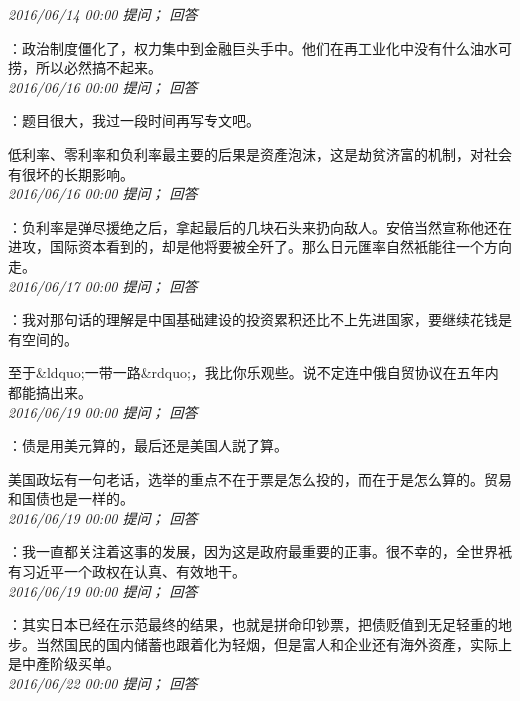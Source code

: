 \documentclass[twocolumn]{ctexart}
\begin{document}
\textit{\hfill\noindent\small 2016/06/14 00:00 提问； 回答}

：政治制度僵化了，权力集中到金融巨头手中。他们在再工业化中没有什么油水可捞，所以必然搞不起来。\\

\textit{\hfill\noindent\small 2016/06/16 00:00 提问； 回答}

：题目很大，我过一段时间再写专文吧。

低利率、零利率和负利率最主要的后果是资產泡沫，这是劫贫济富的机制，对社会有很坏的长期影响。\\

\textit{\hfill\noindent\small 2016/06/16 00:00 提问； 回答}

：负利率是弹尽援绝之后，拿起最后的几块石头来扔向敌人。安倍当然宣称他还在进攻，国际资本看到的，却是他将要被全歼了。那么日元匯率自然衹能往一个方向走。\\

\textit{\hfill\noindent\small 2016/06/17 00:00 提问； 回答}

：我对那句话的理解是中国基础建设的投资累积还比不上先进国家，要继续花钱是有空间的。

至于\&ldquo;一带一路\&rdquo;，我比你乐观些。说不定连中俄自贸协议在五年内都能搞出来。\\

\textit{\hfill\noindent\small 2016/06/19 00:00 提问； 回答}

：债是用美元算的，最后还是美国人説了算。

美国政坛有一句老话，选举的重点不在于票是怎么投的，而在于是怎么算的。贸易和国债也是一样的。\\

\textit{\hfill\noindent\small 2016/06/19 00:00 提问； 回答}

：我一直都关注着这事的发展，因为这是政府最重要的正事。很不幸的，全世界衹有习近平一个政权在认真、有效地干。\\

\textit{\hfill\noindent\small 2016/06/19 00:00 提问； 回答}

：其实日本已经在示范最终的结果，也就是拼命印钞票，把债贬值到无足轻重的地步。当然国民的国内储蓄也跟着化为轻烟，但是富人和企业还有海外资產，实际上是中產阶级买单。\\

\textit{\hfill\noindent\small 2016/06/22 00:00 提问； 回答}
\end{document}
